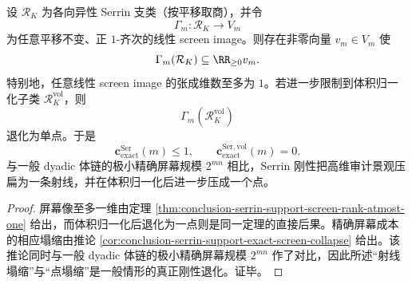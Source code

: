 \begin{theorem}\label{thm:conclusion-serrin-screen-complexity-total-collapse}
设 \(\mathcal R_K\) 为各向异性 Serrin 支类（按平移取商），并令
\[
\Gamma_m:\mathcal R_K\to V_m
\]
为任意平移不变、正 \(1\)-齐次的线性 screen image。则存在非零向量 \(v_m\in V_m\) 使
\[
\Gamma_m(\mathcal R_K)\subseteq \RR_{\ge 0}v_m.
\]
特别地，任意线性 screen image 的张成维数至多为 \(1\)。若进一步限制到体积归一化子类 \(\mathcal R_K^{\mathrm{vol}}\)，则
\[
\Gamma_m(\mathcal R_K^{\mathrm{vol}})
\]
退化为单点。于是
\[
\mathbf c_{\mathrm{exact}}^{\mathrm{Ser}}(m)\le 1,
\qquad
\mathbf c_{\mathrm{exact}}^{\mathrm{Ser,vol}}(m)=0.
\]
与一般 dyadic 体链的极小精确屏幕规模 \(2^{mn}\) 相比，Serrin 刚性把高维审计景观压扁为一条射线，并在体积归一化后进一步压成一个点。
\end{theorem}
\begin{proof}
屏幕像至多一维由定理 \ref{thm:conclusion-serrin-support-screen-rank-atmost-one} 给出，而体积归一化后退化为一点则是同一定理的直接后果。精确屏幕成本的相应塌缩由推论 \ref{cor:conclusion-serrin-support-exact-screen-collapse} 给出。该推论同时与一般 dyadic 体链的极小精确屏幕规模 \(2^{mn}\) 作了对比，因此所述“射线塌缩”与“点塌缩”是一般情形的真正刚性退化。证毕。
\end{proof}

